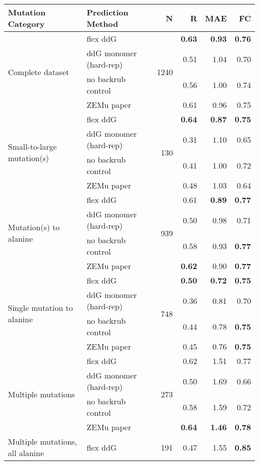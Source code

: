 \begin{table}
  \begin{tabular}{llrrrr}
\toprule
Mutation Category &       Prediction Method &     N &    R &  MAE &   FC \\
\midrule
 \multirow{ 4}{*}{Complete dataset} & flex ddG & \multirow{ 4}{*}{1240} & \textbf{0.63} & \textbf{0.93} & \textbf{0.76}  \\
 & ddG monomer (hard-rep) & & 0.51 & 1.04 & 0.70  \\
 & no backrub control & & 0.56 & 1.00 & 0.74  \\
 & ZEMu paper & & 0.61 & 0.96 & 0.75  \\
\hline
 \multirow{ 4}{*}{Small-to-large mutation(s)} & flex ddG & \multirow{ 4}{*}{130} & \textbf{0.64} & \textbf{0.87} & \textbf{0.75}  \\
 & ddG monomer (hard-rep) & & 0.31 & 1.10 & 0.65  \\
 & no backrub control & & 0.41 & 1.00 & 0.72  \\
 & ZEMu paper & & 0.48 & 1.03 & 0.64  \\
\hline
 \multirow{ 4}{*}{Mutation(s) to alanine} & flex ddG & \multirow{ 4}{*}{939} & 0.61 & \textbf{0.89} & \textbf{0.77}  \\
 & ddG monomer (hard-rep) & & 0.50 & 0.98 & 0.71  \\
 & no backrub control & & 0.58 & 0.93 & \textbf{0.77}  \\
 & ZEMu paper & & \textbf{0.62} & 0.90 & \textbf{0.77}  \\
\hline
 \multirow{ 4}{*}{Single mutation to alanine} & flex ddG & \multirow{ 4}{*}{748} & \textbf{0.50} & \textbf{0.72} & \textbf{0.75}  \\
 & ddG monomer (hard-rep) & & 0.36 & 0.81 & 0.70  \\
 & no backrub control & & 0.44 & 0.78 & \textbf{0.75}  \\
 & ZEMu paper & & 0.45 & 0.76 & \textbf{0.75}  \\
\hline
 \multirow{ 4}{*}{Multiple mutations} & flex ddG & \multirow{ 4}{*}{273} & 0.62 & 1.51 & 0.77  \\
 & ddG monomer (hard-rep) & & 0.50 & 1.69 & 0.66  \\
 & no backrub control & & 0.58 & 1.59 & 0.72  \\
 & ZEMu paper & & \textbf{0.64} & \textbf{1.46} & \textbf{0.78}  \\
\hline
 \multirow{ 4}{*}{Multiple mutations, all alanine} & flex ddG & \multirow{ 4}{*}{191} & 0.47 & 1.55 & \textbf{0.85}  \\

\end{tabular}
\end{table}
